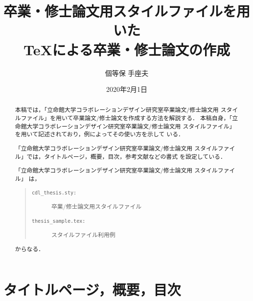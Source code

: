 \documentclass[11pt]{ujreport}
\title{卒業・修士論文用スタイルファイルを用いた\\
       \TeX による卒業・修士論文の作成}
\author{個等保 手座夫}
\date{2020年2月1日}	%
\begin{document}
\maketitle

\begin{abstract}
 本稿では，「立命館大学コラボレーションデザイン研究室卒業論文/修士論文用
 スタイルファイル」を用いて卒業論文/修士論文を作成する方法を解説する．
本稿自身，「立命館大学コラボレーションデザイン研究室卒業論文/修士論文用
 スタイルファイル」を用いて記述されており，例によってその使い方を示して
 いる．

 「立命館大学コラボレーションデザイン研究室卒業論文/修士論文用
 スタイルファイル」では，タイトルページ，概要，目次，参考文献などの書式
 を設定している．

  「立命館大学コラボレーションデザイン研究室卒業論文/修士論文用
 スタイルファイル」
は，
\begin{quote}
  \begin{description}
    \item[\tt cdl\_thesis.sty:] 卒業/修士論文用スタイルファイル
    \item[\tt thesis\_sample.tex:] スタイルファイル利用例
  \end{description}
\end{quote}
からなる．

\end{abstract}

\tableofcontents


\newpage
{}	%



\chapter{タイトルページ，概要，目次}
\end{document}
